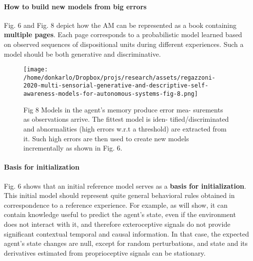 \documentclass{article}
\begin{document}
		\paragraph{How to build new models from big errors}
		\citet{regazzoni-2020-multi-sensorial-generative-and-descriptive-self-awareness-models-for-autonomous-systems} Fig. 6 and Fig. \citet{regazzoni-2020-multi-sensorial-generative-and-descriptive-self-awareness-models-for-autonomous-systems} 8 depict how the AM can be represented as
		a book containing \textbf{multiple pages}. Each page corresponds to
		a probabilistic model learned based on observed sequences of
		dispositional units during different experiences. Such a model
		should be both generative and discriminative. 
		\begin{figure*}
			\centering
			\texttt{[image: /home/donkarlo/Dropbox/projs/research/assets/regazzoni-2020-multi-sensorial-generative-and-descriptive-self-awareness-models-for-autonomous-systems-fig-8.png]}
			\caption{\cite{regazzoni-2020-multi-sensorial-generative-and-descriptive-self-awareness-models-for-autonomous-systems} Fig 8 Models in the agent’s memory produce error mea-
				surements as observations arrive. The fittest model is iden-
				tified/discriminated and abnormalities (high errors w.r.t a
				threshold) are extracted from it. Such high errors are then
				used to create new models incrementally as shown in Fig. 6.
			}
			\label{fig:regazzoni-2020-multi-sensorial-generative-and-descriptive-self-awareness-models-for-autonomous-systems-fig-8.png}
		\end{figure*}	
		\paragraph{Basis for initialization} \citet{regazzoni-2020-multi-sensorial-generative-and-descriptive-self-awareness-models-for-autonomous-systems}Fig. 6 shows that
		an initial reference model serves as a \textbf{basis for initialization}.
		This initial model should represent quite general behavioral rules obtained in correspondence to a reference experience. For example, as \citet{regazzoni-2020-multi-sensorial-generative-and-descriptive-self-awareness-models-for-autonomous-systems} will show, it can contain knowledge useful to
		predict the agent’s state, even if the environment does not interact with it, and therefore exteroceptive signals do not provide significant contextual temporal and causal information. In that case, the expected agent’s state changes are null, except for random perturbations, and state and its derivatives estimated from proprioceptive signals can be stationary.
\end{document}

